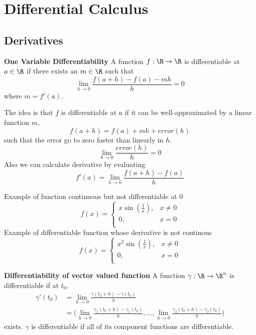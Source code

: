 \documentclass[11pt]{article}
\begin{document}
\section*{Differential Calculus}

\subsection*{Derivatives}

\begin{defn*}
  \label{one variable differentiability}
  \textbf{One Variable Differentiability} A function $f: \R \rightarrow \R$ is differentiable at $a\in\R$ if there exists an $m\in\R$ such that
  \[
    \lim_{h\to 0} \frac{f(a+h) - f(a) - mh}{h} = 0
  \]
  where $m=f'(a)$.
  \begin{rem}
    $ $\\
    The idea is that $f$ is differentiable at $a$ if it can be well-approximated by a linear function $m$,
    \[
      f(a+h) = f(a) + mh + error(h)
    \]
    such that the error go to zero faster than linearly in $h$.
    \[
      \lim_{h\to 0} \frac{error(h)}{h} = 0
    \]
    Also we can calculate derivative by evaluating
    \[
      f'(a) = \lim_{h\to 0} \frac{f(a+h)- f(a)}{h}
    \]
  \end{rem}
\end{defn*}


\begin{note}
  Example of function continuous but not differentiable at 0
  \[
    f(x) =
    \begin{cases}
      x\sin(\frac{1}{x}), & x\neq 0\\
      0,& x = 0\\
    \end{cases}
  \]
  Example of differentiable function whose derivative is not continous
  \[
    f(x) =
    \begin{cases}
      x^2\sin(\frac{1}{x}), & x\neq 0\\
      0,& x = 0\\
    \end{cases}
  \]
\end{note}

\begin{defn*}
  \label{Vector valued differentiability}
  \textbf{Differentiability of vector valued function} A function $\gamma: \R\rightarrow \R^n$ is differentiable if at $t_0$,
  \begin{align*}
    \gamma'(t_0) &= \lim_{h\to 0} \frac{\gamma(t_0 + h) - \gamma(t_0)}{h}\\
    &= \big( \lim_{h\to 0} \frac{\gamma_1(t_0 + h) - \gamma_1(t_0)}{h}, \dots,  \lim_{h\to 0} \frac{\gamma_2(t_0 + h) - \gamma_2(t_0)}{h} \big)
  \end{align*}
  exists. $\gamma$ is differentiable if all of its component functions are differentiable.
\end{defn*}
\end{document}
